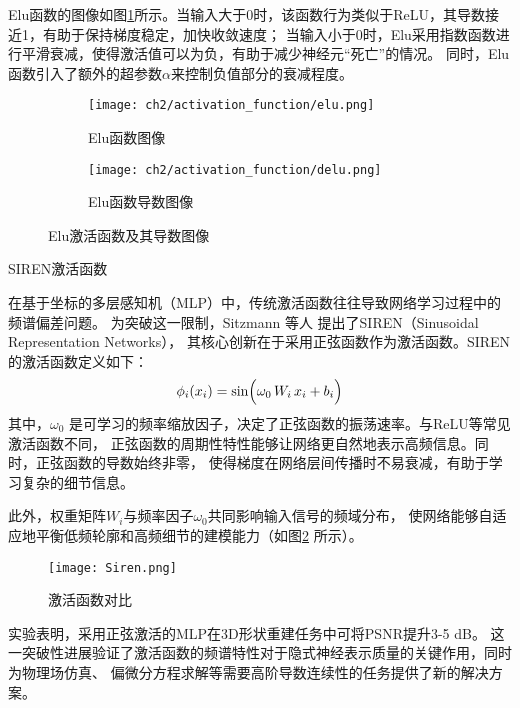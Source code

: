 Elu函数的图像如图\ref{fig:elu}所示。当输入大于0时，该函数行为类似于ReLU，其导数接近1，有助于保持梯度稳定，加快收敛速度；
当输入小于0时，Elu采用指数函数进行平滑衰减，使得激活值可以为负，有助于减少神经元“死亡”的情况。
同时，Elu函数引入了额外的超参数$\alpha$来控制负值部分的衰减程度。

\begin{figure}[H]
  \centering
  \begin{subfigure}[t]{0.45\textwidth}
    \centering
    \texttt{[image: ch2/activation\_function/elu.png]}
    \caption{Elu函数图像}
  \end{subfigure}
  \begin{subfigure}[t]{0.45\textwidth}
    \centering
    \texttt{[image: ch2/activation\_function/delu.png]}
    \caption{Elu函数导数图像}
  \end{subfigure}
  \caption{Elu激活函数及其导数图像}
  \label{fig:elu}
\end{figure}

 SIREN激活函数

在基于坐标的多层感知机（MLP）中，传统激活函数往往导致网络学习过程中的频谱偏差问题。
为突破这一限制，Sitzmann 等人\cite{sitzmann2020implicit} 提出了SIREN（Sinusoidal Representation Networks），
其核心创新在于采用正弦函数作为激活函数。SIREN的激活函数定义如下：
\begin{equation}\label{eq:siren}
\phi_i(x_i)=\sin\Bigl(\omega_0\,W_i\,x_i+b_i\Bigr)
\end{equation}
其中，$\omega_0$ 是可学习的频率缩放因子，决定了正弦函数的振荡速率。与ReLU等常见激活函数不同，
正弦函数的周期性特性能够让网络更自然地表示高频信息。同时，正弦函数的导数始终非零，
使得梯度在网络层间传播时不易衰减，有助于学习复杂的细节信息。

此外，权重矩阵$W_i$与频率因子$\omega_0$共同影响输入信号的频域分布，
使网络能够自适应地平衡低频轮廓和高频细节的建模能力（如图\ref{fig:siren_compare} 所示）。

\begin{figure}[htb]
  \centering
  \texttt{[image: Siren.png]}
  \caption{激活函数对比\cite{sitzmann2020implicit}}
  \label{fig:siren_compare}
\end{figure}

实验\cite{sitzmann2020implicit}表明，采用正弦激活的MLP在3D形状重建任务中可将PSNR提升3-5 dB。
这一突破性进展验证了激活函数的频谱特性对于隐式神经表示质量的关键作用，同时为物理场仿真、
偏微分方程求解等需要高阶导数连续性的任务提供了新的解决方案。

